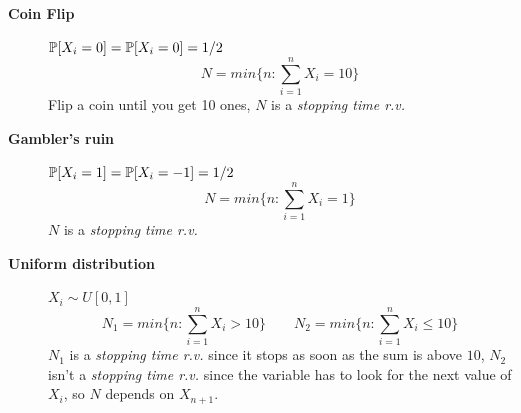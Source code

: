\begin{description}
	\item[\textbf{Coin Flip}]
		$\mathbb{P}[X_i=0] = \mathbb{P}[X_i=0] = 1/2$
		\begin{equation*}
			N = min\bigg\{n:\sum_{i=1}^n X_i = 10\bigg\}
		\end{equation*}
		Flip a coin until you get 10 ones, $N$ is a \textit{stopping time r.v.}
	\item[\textbf{Gambler's ruin}]
		$\mathbb{P}[X_i=1] = \mathbb{P}[X_i=-1] = 1/2$
		\begin{equation*}
			N = min\bigg\{n:\sum_{i=1}^n X_i = 1\bigg\}
		\end{equation*}
		$N$ is a \textit{stopping time r.v.}
	\item[\textbf{Uniform distribution}]
		$X_i \sim U[0,1]$
		\begin{equation*}
			N_1 = min\bigg\{n:\sum_{i=1}^n X_i > 10\bigg\} \qquad
			N_2 = min\bigg\{n:\sum_{i=1}^n X_i \le 10\bigg\}
		\end{equation*}
		$N_1$ is a \textit{stopping time r.v.} since it stops as soon as the sum is above $10$, $N_2$ isn't a \textit{stopping time r.v.} since the variable has to look for the next value of $X_i$, so $N$ depends on $X_{n+1}$.
\end{description}

